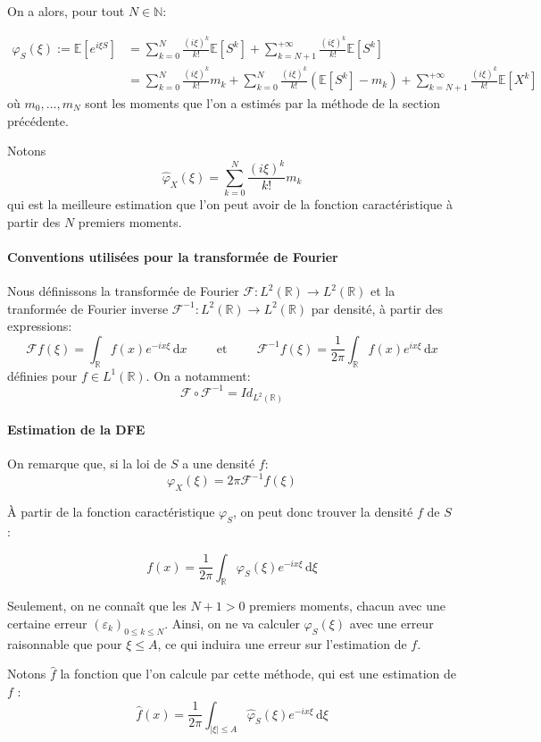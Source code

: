 \documentclass[12pt]{article}
\newcommand{\pth}[1]{\left(#1\right)}
\newcommand{\cro}[1]{\left[#1\right]}
\newcommand{\abs}[1]{\left|#1\right|}
\newcommand{\et}{\hspace{1cm}\text{et}\hspace{1cm}}
\newcommand{\Er}{\mathbb{R}}
\newcommand{\En}{\mathbb{N}}
\newcommand{\Esp}[1]{\mathbb{E}\cro{#1}}
\newcommand{\de}{\,\mathrm{d}}
\newcommand{\fr}{\mathcal{F}}
\begin{document}
On a alors, pour tout $N\in\En$:

\begin{align*}
\varphi_S(\xi):=\Esp{e^{i\xi S}}
&=\sum_{k=0}^{N}\frac{(i\xi)^k}{k!}\Esp{S^k}+\sum_{k=N+1}^{+\infty}\frac{(i\xi)^k}{k!}\Esp{S^k}\\
&= \sum_{k=0}^{N}\frac{(i\xi)^k}{k!}m_k + \sum_{k=0}^{N}\frac{(i\xi)^k}{k!}\pth{\Esp{S^k}-m_k}+\sum_{k=N+1}^{+\infty}\frac{(i\xi)^k}{k!}\Esp{X^k}
\end{align*}
où $m_0,\hdots, m_N$ sont les moments que l'on a estimés par la méthode de la section précédente.

Notons \[\hat{\varphi}_X(\xi)=\sum_{k=0}^{N}\frac{(i\xi)^k}{k!}m_k\] qui est la meilleure estimation que l'on peut avoir de la fonction caractéristique à partir des $N$ premiers moments.

\paragraph{Conventions utilisées pour la transformée de Fourier}

Nous définissons la transformée de Fourier $\fr:L^2(\Er)\to L^2(\Er)$ et la tranformée de Fourier inverse $\fr^{-1}:L^2(\Er)\to L^2(\Er)$ par densité, à partir des expressions:
\[\fr f(\xi)=\int_{\Er}f(x)e^{-ix\xi}\de x\et \fr ^{-1}f(\xi)=\frac{1}{2\pi}\int_{\Er}f(x)e^{ix\xi}\de x\]
définies pour $f\in L^1(\Er)$. On a notamment: \[\fr\circ\fr^{-1}=Id_{L^2(\Er)}\]

\paragraph{Estimation de la DFE}

On remarque que, si la loi de $S$ a une densité $f$:
\[\varphi_X(\xi)=2\pi \mathcal{F}^{-1}f(\xi)\]

À partir de la fonction caractéristique $\varphi_S$, on peut donc trouver la densité $f$ de $S$ :

\[f(x) = \frac1{2\pi} \int_{\mathbb R}\varphi_S(\xi)e^{-ix\xi}\de\xi\]

Seulement, on ne connaît que les $N+1>0$ premiers moments, chacun avec une certaine erreur $(\varepsilon_k)_{0\leqslant k\leqslant N}$. Ainsi, on ne va calculer $\varphi_S(\xi)$ avec une erreur raisonnable que pour $\xi\leqslant A$, ce qui induira une erreur sur l'estimation de $f$.

Notons $\hat{f}$ la fonction que l'on calcule par cette méthode, qui est une estimation de $f$ : 
\begin{equation}\label{dfe1}
  \hat{f}(x) = \frac1{2\pi} \int_{\abs{\xi}\leqslant A}\hat\varphi_S(\xi)e^{-ix\xi}\de\xi
\end{equation}
\end{document}
